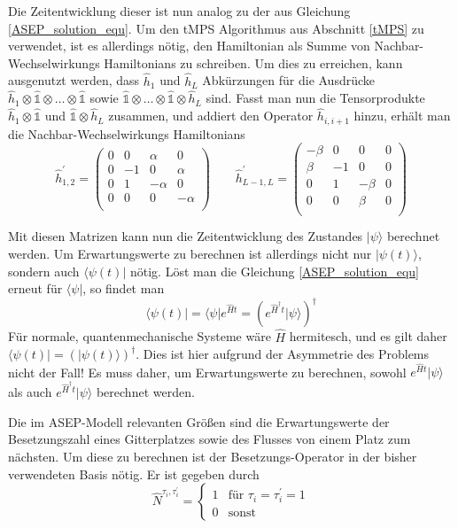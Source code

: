 \documentclass[10pt,a4paper]{report}
\begin{document}
Die Zeitentwicklung dieser ist nun analog zu der aus Gleichung \ref{ASEP_solution_equ}. Um den tMPS Algorithmus aus Abschnitt \ref{tMPS} zu verwendet, ist es allerdings nötig, den Hamiltonian als Summe von Nachbar-Wechselwirkungs Hamiltonians zu schreiben. Um dies zu erreichen, kann ausgenutzt werden, dass $\hat{h}_1$ und $\hat{h}_L$ Abkürzungen für die Ausdrücke $\hat{h}_1\otimes\hat{\mathbb{1}}\otimes\ldots\otimes\hat{\mathbb{1}}$ sowie $\hat{\mathbb{1}}\otimes\ldots\otimes\hat{\mathbb{1}}\otimes\hat{h}_L$ sind. Fasst man nun die Tensorprodukte $\hat{h}_1\otimes\hat{\mathbb{1}}$ und $\hat{\mathbb{1}}\otimes\hat{h}_L$ zusammen, und addiert den Operator $\hat{h}_{i,i+1}$ hinzu, erhält man die Nachbar-Wechselwirkungs Hamiltonians
\begin{equation}
\hat{h}_{1,2}^\prime=
\begin{pmatrix}
0&0&\alpha&0\\
0&-1&0&\alpha\\
0&1&-\alpha&0\\
0&0&0&-\alpha\\
\end{pmatrix}
\qquad
\hat{h}_{L-1,L}^\prime=
\begin{pmatrix}
-\beta&0&0&0\\
\beta&-1&0&0\\
0&1&-\beta&0\\
0&0&\beta&0\\
\end{pmatrix}
\end{equation} 

Mit diesen Matrizen kann nun die Zeitentwicklung des Zustandes $|\psi\rangle$ berechnet werden. Um Erwartungswerte zu berechnen ist allerdings nicht nur $|\psi(t)\rangle$, sondern auch $\langle\psi(t)|$ nötig. Löst man die Gleichung \ref{ASEP_solution_equ} erneut für $\langle\psi|$, so findet man
\begin{equation}
\langle\psi(t)|=\langle\psi|e^{\hat{H}t}=(e^{\hat{H}^\dagger t}|\psi\rangle)^\dagger
\end{equation}
Für normale, quantenmechanische Systeme wäre $\hat{H}$ hermitesch, und es gilt daher $\langle\psi(t)|=(|\psi(t)\rangle)^\dagger$. Dies ist hier aufgrund der Asymmetrie des Problems nicht der Fall! Es muss daher, um Erwartungswerte zu berechnen, sowohl $e^{\hat{H} t}|\psi\rangle$ als auch $e^{\hat{H}^\dagger t}|\psi\rangle$ berechnet werden.

Die im ASEP-Modell relevanten Größen sind die Erwartungswerte der Besetzungszahl eines Gitterplatzes sowie des Flusses von einem Platz zum nächsten. Um diese zu berechnen ist der Besetzungs-Operator in der bisher verwendeten Basis nötig. Er ist gegeben durch
\begin{equation}
\hat{N}^{\tau_i,\tau_i^{\prime}}=
\begin{cases}
1&\text{für }\tau_i=\tau_i^{\prime}=1\\
0&\text{sonst}
\end{cases}
\end{equation}
\end{document}

